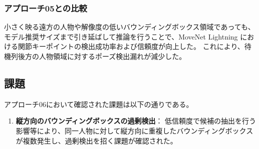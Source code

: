 \subsubsection{アプローチ05との比較}
小さく映る遠方の人物や解像度の低いバウンディングボックス領域であっても、モデル推奨サイズまで引き延ばして推論を行うことで、MoveNet Lightning における関節キーポイントの検出成功率および信頼度が向上した。
これにより、待機列後方の人物領域に対するポーズ検出漏れが減少した。

\subsection{課題}
アプローチ06において確認された課題は以下の通りである。

\begin{enumerate}
    \item \textbf{縦方向のバウンディングボックスの過剰検出}：
    低信頼度で候補の抽出を行う影響等により、同一人物に対して縦方向に重複したバウンディングボックスが複数発生し、過剰検出を招く課題が確認された。
\end{enumerate}

\clearpage
